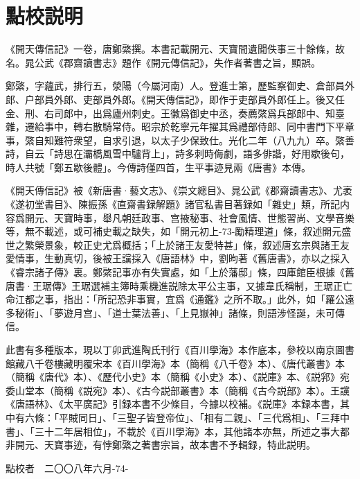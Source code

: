 \documentclass[UTF8,scheme=chinese]{ctexbook}
\newcommand{\pagenum}{\footnotesize\heiti\color{red}}
\begin{document}
%

\chapter{點校説明}

《開天傳信記》一卷，唐鄭綮撰。本書記載開元、天寶間遺聞佚事三十餘條，故名。晁公武《郡齋讀書志》題作《開元傳信記》，失作者著書之旨，顯誤。

鄭綮，字蘊武，排行五，滎陽（今屬河南）人。登進士第，歷監察御史、倉部員外郎、户部員外郎、吏部員外郎。《開天傳信記》，即作于吏部員外郎任上。後又任金、刑、右司郎中，出爲廬州刺史。王徽爲御史中丞，奏薦綮爲兵部郎中、知臺雜，遷給事中，轉右散騎常侍。昭宗於乾寧元年擢其爲禮部侍郎、同中書門下平章事，綮自知難符衆望，自求引退，以太子少保致仕。光化二年（八九九）卒。綮善詩，自云「詩思在灞橋風雪中驢背上」，詩多刺時侮劇，語多俳諧，好用歇後句，時人共號「鄭五歇後體」。今傳詩僅四首，生平事迹見兩《唐書》本傳。

《開天傳信記》被《新唐書·藝文志》、《崇文總目》、晁公武《郡齋讀書志》、尤袤《遂初堂書目》、陳振孫《直齋書録解題》諸官私書目著録如「雜史」類，所記内容爲開元、天寶時事，舉凡朝廷政事、宫掖秘事、社會風情、世態習尚、文學音樂等，無不載述，或可補史載之缺失，如「開元初上{\pagenum -73-}勵精理道」條，叙述開元盛世之繁榮景象，較正史尤爲概括；「上於諸王友愛特甚」條，叙述唐玄宗與諸王友愛情事，生動真切，後被王讜採入《唐語林》中，劉昫著《舊唐書》，亦以之採入《睿宗諸子傳》裏。鄭綮記事亦有失實處，如「上於藩邸」條，四庫館臣根據《舊唐書·王琚傳》王琚選補主簿時乘機進説除太平公主事，又據韋氏稱制，王琚正亡命江都之事，指出：「所記恐非事實，宜爲《通鑑》之所不取。」此外，如「羅公遠多秘術」、「夢遊月宫」、「道士葉法善」、「上見嶽神」諸條，則語涉怪誕，未可傳信。

此書有多種版本，現以丁卯武進陶氏刊行《百川學海》本作底本，參校以南京圖書館藏八千卷樓藏明覆宋本《百川學海》本（簡稱《八千卷》本）、《唐代叢書》本（簡稱《唐代》本）、《歷代小史》本（簡稱《小史》本）、《説庫》本、《説郛》宛委山堂本（簡稱《説宛》本）、《古今説部叢書》本（簡稱《古今説部》本）。王讜《唐語林》、《太平廣記》引録本書不少條目，今據以校補。《説庫》本録本書，其中有六條：「平賊同日」、「三聖子皆登帝位」、「相有二親」、「三代爲相」、「三拜中書」、「三十二年居相位」，不載於《百川學海》本，其他諸本亦無，所述之事大都非開元、天寶事迹，有悖鄭綮之著書宗旨，故本書不予輯録，特此説明。

\begin{flushright}
點校者　二〇〇八年六月{\pagenum -74-}
\end{flushright}
\end{document}
